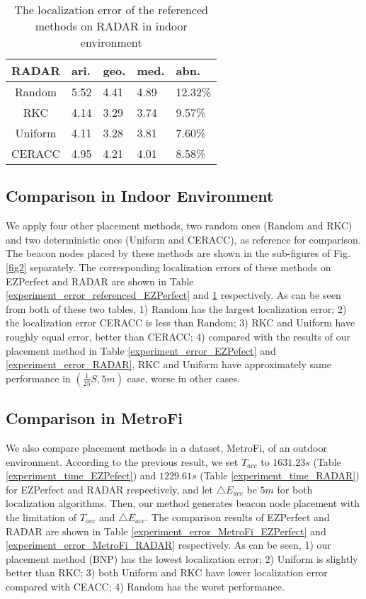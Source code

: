 \documentclass[10pt, conference, letterpaper]{IEEEtran}
\begin{document}
\begin{table}[!t]
\renewcommand{\arraystretch}{1.0}
\caption{The localization error of the referenced methods on RADAR in indoor environment} \label{experiment_error_referenced_RADAR}
\centering
\begin{tabular}{|c|p{0.9cm}|p{0.9cm}|p{0.9cm}|p{0.9cm}|}
  \hline
RADAR  & ari. & geo. & med. & abn. \\
  \hline
  Random & 5.52 & 4.41 & 4.89 & 12.32\% \\
  \hline
  RKC & 4.14 & 3.29 & 3.74 & 9.57\% \\
  \hline
  Uniform & 4.11 & 3.28 & 3.81 & 7.60\% \\
  \hline
  CERACC & 4.95 & 4.21 & 4.01 & 8.58\% \\
  \hline
\end{tabular}
\end{table}

\subsection{Comparison in Indoor Environment}
We apply four other placement methods, two random ones (Random and RKC) and two deterministic ones (Uniform and CERACC), as reference for comparison. The beacon nodes placed by these methods are shown in the sub-figures of Fig. \ref{fig2} separately. The corresponding localization errors of these methods on EZPerfect and RADAR are shown in Table \ref{experiment_error_referenced_EZPerfect} and \ref{experiment_error_referenced_RADAR} respectively. As can be seen from both of these two tables, 1) Random has the largest localization error; 2) the localization error CERACC is less than Random; 3) RKC and Uniform have roughly equal error, better than CERACC; 4) compared with the results of our placement method in Table \ref{experiment_error_EZPefect} and \ref{experiment_error_RADAR}, RKC and Uniform have approximately same performance in $(\frac{1}{25}S, 5m)$ case, worse in other cases.

\subsection{Comparison in MetroFi}
We also compare placement methods in a dataset, MetroFi, of an outdoor environment. According to the previous result, we set $T_{acc}$ to $1631.23s$ (Table \ref{experiment_time_EZPefect}) and $1229.61s$ (Table \ref{experiment_time_RADAR}) for EZPerfect and RADAR respectively, and let $\triangle E_{acc}$ be $5m$ for both localization algorithms. Then, our method generates beacon node placement with the limitation of $T_{acc}$ and $\triangle E_{acc}$. The comparison results of EZPerfect and RADAR are shown in Table \ref{experiment_error_MetroFi_EZPerfect} and \ref{experiment_error_MetroFi_RADAR} respectively. As can be seen, 1) our placement method (BNP) has the lowest localization error; 2) Uniform is slightly better than RKC; 3) both Uniform and RKC have lower localization error compared with CEACC; 4) Random has the worst performance.
\end{document}
